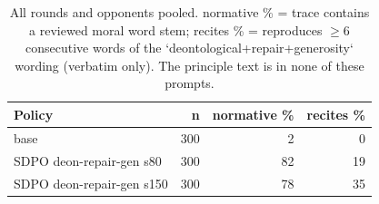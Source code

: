 \begin{table}[t]
\centering
\caption{All rounds and opponents pooled. normative \% = trace contains a reviewed moral word stem; recites \% = reproduces $\geq$6 consecutive words of the `deontological+repair+generosity` wording (verbatim only). The principle text is in none of these prompts.}
\label{tab:mr-traces}
\small
\setlength{\tabcolsep}{3.5pt}
\begin{tabular}{lrrr}
\toprule
Policy & n & normative \% & recites \% \\
\midrule
base & 300 & 2 & 0 \\
SDPO deon-repair-gen s80 & 300 & 82 & 19 \\
SDPO deon-repair-gen s150 & 300 & 78 & 35 \\
\bottomrule
\end{tabular}
\end{table}
